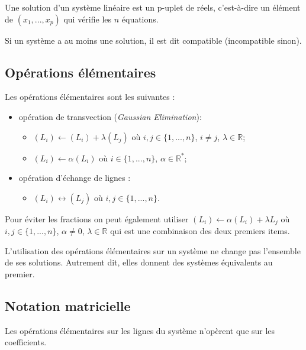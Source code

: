 \documentclass[10pt]{article}
\begin{document}
\begin{defi}
Une solution d'un système linéaire est un p-uplet de réels, c'est-à-dire un élément de $(x_1,...,x_p)$ qui vérifie les $n$ équations. 
\end{defi}


\begin{defi}
Si un système a au moins une solution, il est dit compatible (incompatible sinon).
\end{defi}


\subsection{Opérations élémentaires}
\begin{defi}
Les opérations élémentaires sont les suivantes :
\begin{itemize}
\item opération de transvection (\textit{Gaussian Elimination}): 
\begin{itemize}
\item $(L_i)\leftarrow (L_i)+\lambda (L_j)$ où $i,j\in \{1,...,n\}$, $i\neq j$, $\lambda \in \mathbb{R}$;
\item $(L_i)\leftarrow \alpha (L_i)$ où $i\in \{1,...,n\}$, $\alpha \in \mathbb{R}^*$;
\end{itemize}
\item opération d'échange de lignes : 
\begin{itemize}
\item $(L_i)\leftrightarrow  (L_j)$ où $i,j\in \{1,...,n\}$. 
\end{itemize}
\end{itemize}
\end{defi}

\begin{rem}
Pour éviter les fractions on peut également utiliser $(L_i)\leftarrow \alpha (L_i) + \lambda L_j$ où $i,j\in \{1,...,n\}$, $\alpha \neq 0$, $\lambda \in \mathbb{R}$ qui est une combinaison des deux premiers items.
\end{rem}

\begin{prop}
L'utilisation des opérations élémentaires sur un système ne change pas l'ensemble de ses solutions. Autrement dit, elles donnent des systèmes équivalents au premier.
\end{prop}

\subsection{Notation matricielle}
\begin{rem}
Les opérations élémentaires sur les lignes du système n'opèrent que sur les coefficients. 
\end{rem}
\end{document}
